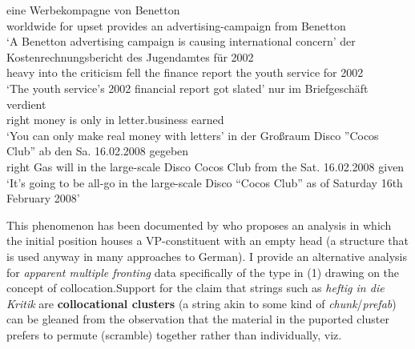 \documentclass[11pt,a4paper,fleqn]{article}
\begin{document}
\eal
     \ex {} eine Werbekompagne von Benetton\footnotemark  \\                     		
	   worldwide {for upset} provides an advertising-campaign from Benetton \\
           \glt `A Benetton advertising campaign is causing international concern'
  \ex
       der Kostenrechnungsbericht    des Jugendamtes   für 2002\footnotemark \\
                    heavy       into          the        criticism         fell           the {finance report}          the {youth service} for 2002 \\
        \glt `The youth service's 2002 financial report got slated'
    \ex
      nur im Briefgeschäft verdient\footnotemark  \\                     		
	   right money is only in letter.business earned \\
           \glt `You can only make real money with letters'
   \ex
      in der Großraum Disco ''Cocos Club'' ab den Sa. 16.02.2008 gegeben\footnotemark  \\                     		
	  right Gas will in the large-scale Disco Cocos Club from the Sat. 16.02.2008 given \\
           \glt `It's going to be all-go in the large-scale Disco ``Cocos Club'' as of Saturday 16th February 2008'
\zl


\noindent This phenomenon has been documented by \cite{Mueller2003b, Mueller2005e} who proposes an analysis in which the initial position houses a VP-constituent 
with an empty head (a structure that is used anyway in many approaches to German). I provide an alternative
analysis for \textit{apparent multiple fronting} data specifically of the type in (1) drawing on the concept of collocation.\footnotemark Support for the claim that strings such as \textit{heftig in die Kritik} are \textbf{collocational clusters} (a string akin to some kind of \textit{chunk}/\textit{prefab}) can be 
gleaned from the observation that the material in the puported cluster prefers to permute (scramble) together 
rather than individually, viz.   
\end{document}

